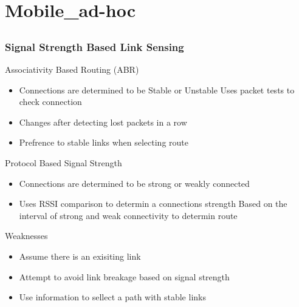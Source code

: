 \section{Mobile_ad-hoc}
\subsection*{}


\begin{frame}[t]
  \frametitle{Signal Strength Based Link Sensing}
  
  Associativity Based Routing (ABR)
  \begin{itemize}
  \item Connections are determined to be Stable or Unstable
  \irem Uses packet tests to check connection
  \item Changes after detecting lost packets in a row
  \item Prefrence to stable links when selecting route
  \end{itemize}

  \vfill
  
  Protocol Based Signal Strength
  \begin{itemize}
  \item Connections are determined to be strong or weakly connected
  \item Uses RSSI comparison to determin a connections strength
  \itme Based on the interval of strong and weak connectivity to determin route
  \end{itemize}

  \vfill

  Weaknesses
  \begin{itemize}
    \item Assume there is an exisiting link
    \item Attempt to avoid link breakage based on signal strength
    \item Use information to sellect a path with stable links
  \end{itemize}

  \vfill

  \begin{flushleft}
    \begin{tiny}
      \begin{minipage}{1.0\linewidth}
      \end{minipage}
    \end{tiny}
  \end{flushleft}
  
\end{frame}

